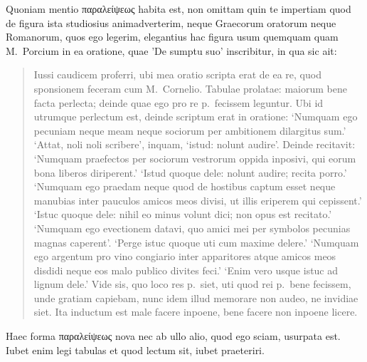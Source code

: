 Quoniam mentio παραλείψεως habita est, non omittam quin te impertiam quod de figura ista studiosius animadverterim, neque Graecorum oratorum neque Romanorum, quos ego legerim, elegantius hac figura usum quemquam quam M.\ Porcium in ea oratione, quae 'De sumptu suo' inscribitur, in qua sic ait: 
\begin{quotation}
\noindent Iussi caudicem proferri, ubi mea oratio scripta erat de ea re, quod sponsionem feceram cum M.\ Cornelio. Tabulae prolatae: maiorum bene facta perlecta; deinde quae ego pro re p.\ fecissem leguntur. Ubi id utrumque perlectum est, deinde scriptum erat in oratione: `Numquam ego pecuniam neque meam neque sociorum per ambitionem dilargitus sum.' `Attat, noli noli scribere', inquam, `istud: nolunt audire'. Deinde recitavit: `Numquam praefectos per sociorum vestrorum oppida inposivi, qui eorum bona liberos diriperent.' `Istud quoque dele: nolunt audire; recita porro.' `Numquam ego praedam neque quod de hostibus captum esset neque manubias inter pauculos amicos meos divisi, ut illis eriperem qui cepissent.' `Istuc quoque dele: nihil eo minus volunt dici; non opus est recitato.' `Numquam ego evectionem datavi, quo amici mei per symbolos pecunias magnas caperent'. `Perge istuc quoque uti cum maxime delere.' `Numquam ego argentum pro vino congiario inter apparitores atque amicos meos disdidi neque eos malo publico divites feci.' `Enim vero usque istuc ad lignum dele.' Vide sis, quo loco res p.\ siet, uti quod rei p.\ bene fecissem, unde gratiam capiebam, nunc idem illud memorare non audeo, ne invidiae siet. Ita inductum est male facere inpoene, bene facere non inpoene licere.
\end{quotation}

\noindent Haec forma παραλείψεως nova nec ab ullo alio, quod ego sciam, usurpata est. Iubet enim legi tabulas et quod lectum sit, iubet praeteriri.
